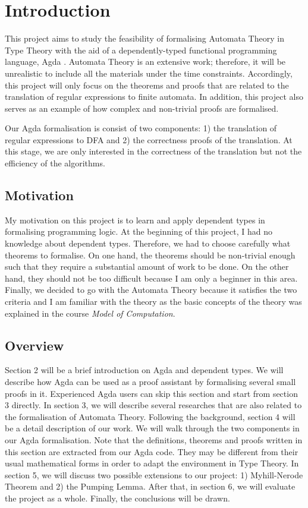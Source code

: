 \section{Introduction}
\par This project aims to study the feasibility of formalising
Automata Theory \cite{aho1972} in Type Theory \cite{martin1984} with the aid of a dependently-typed
functional programming language, Agda \cite{agdawiki2016}. Automata
Theory is an extensive work; therefore, it will be unrealistic to
include all the materials under the time constraints. Accordingly, this project will only focus on the theorems and
proofs that are related to the translation of regular expressions
to finite automata. In addition, this project also serves as an
example of how complex and non-trivial proofs are formalised. 

\par Our Agda formalisation is consist of two components: 1) the
translation of regular expressions to DFA and 2)
the correctness proofs of the translation. At this stage, we are only
interested in the correctness of the translation but not the
efficiency of the algorithms. 


\subsection{Motivation}
\par My motivation on this project is to learn and apply
dependent types in formalising programming logic. At the beginning of
this project, I had no knowledge about dependent types. Therefore, we
had to choose carefully what theorems to formalise. On one hand, the theorems
should be non-trivial enough such that they require a substantial
amount of work to be done. On the other hand, they should not be too
difficult because I am only a beginner in this area. Finally, we
decided to go with the Automata Theory because it satisfies the two
criteria and I am familiar with the theory as the basic concepts of the
theory was explained in the course \textit{Model of Computation}. 


\subsection{Overview}
\par Section 2 will be a brief introduction on Agda and
dependent types. We will describe how Agda can be used as a proof
assistant by formalising several small proofs in it. Experienced Agda
users can skip this section and start from section 3 directly. In
section 3, we will describe several researches
that are also related to the formalisation of Automata
Theory. Following the background, section 4 will be a detail description of our
work. We will walk through the two components in our Agda
formalisation. Note that the definitions,
theorems and proofs written in this section are extracted from our
Agda code. They may be different from
their usual mathematical forms in order to adapt the environment in
Type Theory. In section 5, we will discuss two possible extensions
to our project: 1) Myhill-Nerode Theorem and 2) the Pumping
Lemma. After that, in section 6, we will evaluate the project as a
whole. Finally, the conclusions will be drawn. 